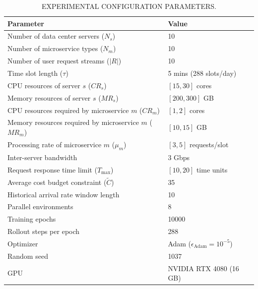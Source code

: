 
\begin{table}[htbp]
\centering
\caption{EXPERIMENTAL CONFIGURATION PARAMETERS.}
\label{tab:exp_config}
\begin{tabular}{ll}
\toprule
\textbf{Parameter} & \textbf{Value} \\
\midrule
Number of data center servers ($N_s$) & 10 \\
Number of microservice types ($N_m$) & 10 \\
Number of user request streams ($|R|$) & 10 \\
Time slot length ($\tau$) & 5 mins (288 slots/day) \\
CPU resources of server $s$ ($CR_s$) & $[15, 30]$ cores \\
Memory resources of server $s$ ($MR_s$) & $[200, 300]$ GB \\
CPU resources required by microservice $m$ ($CR_m$) & $[1, 2]$ cores \\
Memory resources required by microservice $m$ ($MR_m$) & $[10, 15]$ GB \\
Processing rate of microservice $m$ ($\mu_m$) & $[3, 5]$ requests/slot \\
Inter-server bandwidth & 3 Gbps \\
Request response time limit ($T_{\max}$) & $[10, 20]$ time units \\
Average cost budget constraint ($\tilde{C}$) & 35 \\
Historical arrival rate window length & 10 \\
Parallel environments & 8 \\
Training epochs & 10000 \\
Rollout steps per epoch & 288 \\
Optimizer & Adam ($\epsilon_{\text{Adam}} = 10^{-5}$) \\
Random seed & 1037 \\
GPU & NVIDIA RTX 4080 (16 GB) \\
\bottomrule
\end{tabular}
\end{table}

